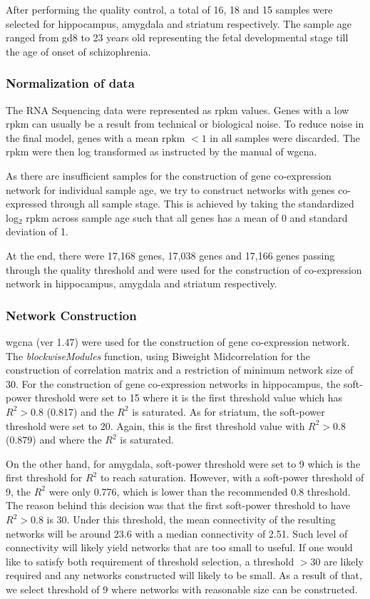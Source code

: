 \documentclass[12pt]{book}
\begin{document}
	After performing the quality control, a total of 16, 18 and 15 samples were selected for hippocampus, amygdala and striatum respectively.
	The sample age ranged from \gls{gd}8 to 23 years old representing the fetal developmental stage till the age of onset of schizophrenia.
	
	\subsubsection{Normalization of data}
	The RNA Sequencing data were represented as \gls{rpkm} values. 
	Genes with a low \gls{rpkm} can usually be a result from technical or biological noise\citep{Hart2013}.
	To reduce noise in the final model, genes with a mean \gls{rpkm} $< 1$ in all samples were discarded. 
	The \gls{rpkm} were then log transformed as instructed by the manual of \gls{wgcna}\citep{Langfelder2008}.
	
	As there are insufficient samples for the construction of gene co-expression network for individual sample age, we try to construct networks with genes co-expressed through all sample stage. 
	This is achieved by taking the standardized log$_2$ \gls{rpkm} across sample age such that all genes has a mean of 0 and standard deviation of 1.
	
	At the end, there were 17,168 genes, 17,038 genes and 17,166 genes passing through the quality threshold and were used for the construction of co-expression network in hippocampus, amygdala and striatum respectively. 
	 
	\subsubsection{Network Construction}
	\gls{wgcna} (ver 1.47) were used for the construction of gene co-expression network\citep{Langfelder2008}. 
	The \emph{blockwiseModules} function, using Biweight Midcorrelation for the construction of correlation matrix and a restriction of minimum network size of 30. 
	For the construction of gene co-expression networks in hippocampus, the soft-power threshold were set to 15 where it is the first threshold value which has $R^2 > 0.8$ (0.817) and the $R^2$ is saturated\citep{Zhang2005}.%
	As for striatum, the soft-power threshold were set to 20. 
	Again, this is the first threshold value with $R^2 >0.8$ (0.879) and where the $R^2$ is saturated.
	
	On the other hand, for amygdala, soft-power threshold were set to 9 which is the first threshold for $R^2$ to reach saturation. 
	However, with a soft-power threshold of 9, the $R^2$ were only 0.776, which is lower than the recommended 0.8 threshold.
	The reason behind this decision was that the first soft-power threshold to have $R^2 > 0.8$ is 30.
	Under this threshold, the mean connectivity of the resulting networks will be around 23.6 with a median connectivity of 2.51.
	Such level of connectivity will likely yield networks that are too small to useful.
	If one would like to satisfy both requirement of threshold selection, a threshold $>30$ are likely required and any networks constructed will likely to be small.
	As a result of that, we select threshold of 9 where networks with reasonable size can be constructed.
	
\end{document}
